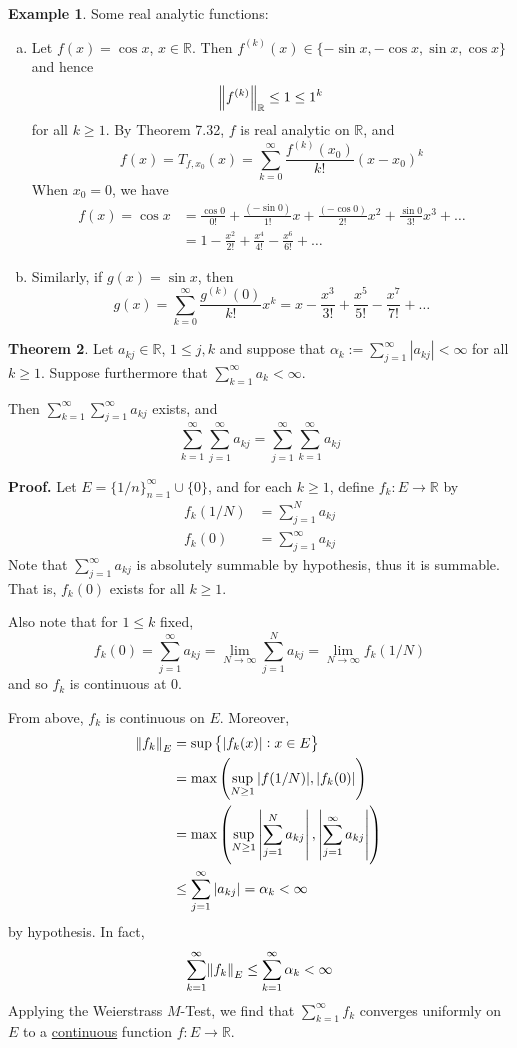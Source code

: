 \documentclass[11pt]{article}
\theoremstyle{definition}
\newtheorem{thm}{Theorem}[section]
\newtheorem{exmp}[thm]{Example}
\newcommand{\mbR}{\ensuremath{\mathbb{R}}}
\begin{document}
\begin{exmp} 
Some real analytic functions:
\begin{enumerate}[(a)] \vspace{-0.2cm}
\item Let $f(x) = \cos x$, $x \in \mbR$. Then $f^{(k)}(x) \in \{-\sin x, -\cos x, \sin x, \cos x\}$ and hence
$$\norm{f^{(k)}}_\mbR \leq 1 \leq 1^k$$
for all $k \geq 1$. By Theorem 7.32, $f$ is real analytic on $\mbR$, and
$$f(x) = T_{f, x_0}(x) = \sum_{k=0}^\infty \frac{f^{(k)}(x_0)}{k!} (x - x_0)^k$$
When $x_0 = 0$, we have
\begin{align*}
f(x) = \cos x & = \frac{\cos 0}{0!} + \frac{(-\sin 0)}{1!} x + \frac{(- \cos 0)}{2!} x^2 + \frac{\sin 0}{3!}x^3 + \dots \\
& = 1 - \frac{x^2}{2!} + \frac{x^4}{4!} - \frac{x^6}{6!} + \dots
\end{align*}
\item Similarly, if $g(x) = \sin x$, then
$$g(x) = \sum_{k=0}^\infty \frac{g^{(k)}(0)}{k!} x^k = x - \frac{x^3}{3!} + \frac{x^5}{5!} - \frac{x^7}{7!} + \dots$$
\end{enumerate}
\end{exmp}

\begin{thm}
Let $a_{kj} \in \mbR$, $1 \leq j, k$ and suppose that $\alpha_k := \sum_{j=1}^\infty |a_{kj}| < \infty$ for all $k \geq 1$. Suppose furthermore that $\sum_{k=1}^\infty a_k < \infty$.

Then $\sum_{k=1}^\infty \sum_{j=1}^\infty a_{kj}$ exists, and
$$\sum_{k=1}^\infty \sum_{j=1}^\infty a_{kj} = \sum_{j=1}^\infty \sum_{k=1}^\infty a_{kj}$$
\end{thm}
\textbf{Proof.} Let $E = \{1/n\}_{n=1}^\infty \cup \{0\}$, and for each $k \geq 1$, define $f_k : E \to \mbR$ by
\begin{align*}
f_k(1/N) & = \sum_{j=1}^N a_{kj} \\
f_k(0) & = \sum_{j=1}^\infty a_{kj}
\end{align*}
Note that $\sum_{j=1}^\infty a_{kj}$ is absolutely summable by hypothesis, thus it is summable. That is, $f_k(0)$ exists for all $k \geq 1$.

Also note that for $1 \leq k$ fixed,
$$f_k(0) = \sum_{j=1}^\infty a_{kj} = \lim_{N\to\infty} \sum_{j=1}^N a_{kj} = \lim_{N\to\infty} f_k(1/N)$$
and so $f_k$ is continuous at 0.

From above, $f_k$ is continuous on $E$. Moreover,
\begin{align*}
\norm{f_k}_E & = \sup \left\{ |f_k(x)| : x \in E \right\} \\
& = \max \left( \sup_{N\geq1} |f(1/N)|, |f_k(0)| \right) \\
& = \max \left( \sup_{N\geq1} \left| \sum_{j=1}^N a_{kj} \right|, \left| \sum_{j=1}^\infty a_{kj} \right| \right) \\
& \leq \sum_{j=1}^\infty |a_{kj}| = \alpha_k < \infty
\end{align*}
by hypothesis. In fact,
$$\sum_{k=1}^\infty \norm{f_k}_E \leq \sum_{k=1}^\infty \alpha_k < \infty$$
Applying the Weierstrass $M$-Test, we find that $\sum_{k=1}^\infty f_k$ converges uniformly on $E$ to a \underline{continuous} function $f : E \to \mbR$.
\end{document}
